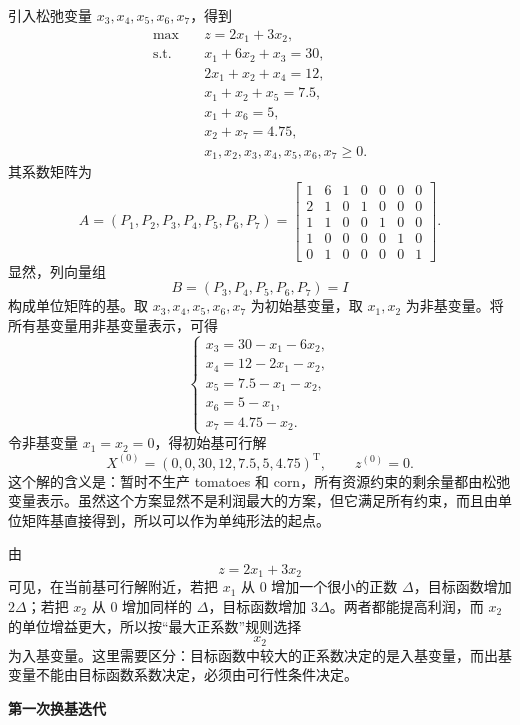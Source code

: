 ﻿\documentclass[UTF8,zihao=-4,fontset=none]{ctexart}
\newcommand{\stepheading}[1]{\vspace{0.6em}\noindent\textbf{#1}\par}
\begin{document}
引入松弛变量 \(x_3,x_4,x_5,x_6,x_7\)，得到
\[
    \begin{aligned}
    \max\quad & z=2x_1+3x_2,\\
    \mathrm{s.t.}\quad
      &x_1+6x_2+x_3=30,\\
      &2x_1+x_2+x_4=12,\\
      &x_1+x_2+x_5=7.5,\\
      &x_1+x_6=5,\\
      &x_2+x_7=4.75,\\
      &x_1,x_2,x_3,x_4,x_5,x_6,x_7\ge 0.
    \end{aligned} \tag{1-7}
\]
其系数矩阵为
\[
    A=(P_1,P_2,P_3,P_4,P_5,P_6,P_7)
    =
    \begin{bmatrix}
      1&6&1&0&0&0&0\\
      2&1&0&1&0&0&0\\
      1&1&0&0&1&0&0\\
      1&0&0&0&0&1&0\\
      0&1&0&0&0&0&1
    \end{bmatrix}. \tag{1-8}
\]
显然，列向量组
\[
    B=(P_3,P_4,P_5,P_6,P_7)=I
\]
构成单位矩阵的基。取 \(x_3,x_4,x_5,x_6,x_7\) 为初始基变量，取 \(x_1,x_2\) 为非基变量。将所有基变量用非基变量表示，可得
\[
    \begin{cases}
    x_3=30-x_1-6x_2,\\
    x_4=12-2x_1-x_2,\\
    x_5=7.5-x_1-x_2,\\
    x_6=5-x_1,\\
    x_7=4.75-x_2.
    \end{cases} \tag{1-9}
\]
令非基变量 \(x_1=x_2=0\)，得初始基可行解
\[
    X^{(0)}=(0,0,30,12,7.5,5,4.75)^{\mathrm T},\qquad z^{(0)}=0. \tag{1-10}
\]
这个解的含义是：暂时不生产 tomatoes 和 corn，所有资源约束的剩余量都由松弛变量表示。虽然这个方案显然不是利润最大的方案，但它满足所有约束，而且由单位矩阵基直接得到，所以可以作为单纯形法的起点。

由
\[
    z=2x_1+3x_2 \tag{1-11}
\]
可见，在当前基可行解附近，若把 \(x_1\) 从 \(0\) 增加一个很小的正数 \(\Delta\)，目标函数增加 \(2\Delta\)；若把 \(x_2\) 从 \(0\) 增加同样的 \(\Delta\)，目标函数增加 \(3\Delta\)。两者都能提高利润，而 \(x_2\) 的单位增益更大，所以按“最大正系数”规则选择
\[
    x_2
\]
为入基变量。这里需要区分：目标函数中较大的正系数决定的是入基变量，而出基变量不能由目标函数系数决定，必须由可行性条件决定。

\stepheading{第一次换基迭代}
\end{document}

